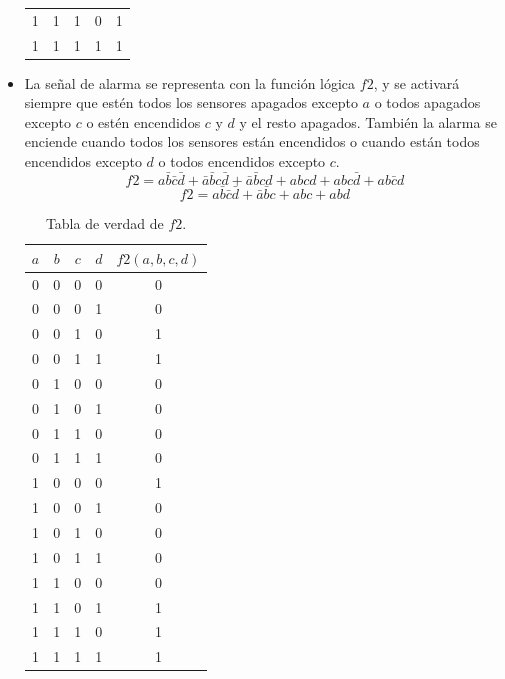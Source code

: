 \begin{itemize}
\begin{table}[H]
\begin{tabular}{ccccc}
        1 & 1 & 1 & 0 & 1 \\
        1 & 1 & 1 & 1 & 1 \\
        \bottomrule
    \end{tabular}
    \end{table}
    \item La señal de  alarma se representa con la función lógica $f2$, y se activará siempre que estén todos los sensores apagados excepto $a$ o todos apagados excepto $c$ o estén encendidos $c$ y $d$ y el resto apagados. 
    También la alarma se enciende cuando todos los sensores están encendidos o cuando están todos encendidos excepto $d$ o todos encendidos excepto $c$.
    \begin{equation*}
        f2 = a\bar{b}\bar{c}\bar{d} + \bar{a}\bar{b}c\bar{d} + \bar{a}\bar{b}cd + abcd + abc\bar{d} + ab\bar{c}d
    \end{equation*}
    \begin{equation*}
        f2 = a\bar{b}\bar{c}\bar{d} + \bar{a}\bar{b}c + abc + abd
    \end{equation*}
    \begin{table}[H]
    \centering
    \caption{Tabla de verdad de $f2$.}
    \label{tab:tv_f2}
    \begin{tabular}{ccccc}
        \toprule
        $a$ & $b$ & $c$ & $d$ & $f2(a,b,c,d)$ \\
        \midrule
        0 & 0 & 0 & 0 & 0 \\
        0 & 0 & 0 & 1 & 0 \\
        0 & 0 & 1 & 0 & 1 \\
        0 & 0 & 1 & 1 & 1 \\
        0 & 1 & 0 & 0 & 0 \\
        0 & 1 & 0 & 1 & 0 \\
        0 & 1 & 1 & 0 & 0 \\
        0 & 1 & 1 & 1 & 0 \\
        1 & 0 & 0 & 0 & 1 \\
        1 & 0 & 0 & 1 & 0 \\
        1 & 0 & 1 & 0 & 0 \\
        1 & 0 & 1 & 1 & 0 \\
        1 & 1 & 0 & 0 & 0 \\
        1 & 1 & 0 & 1 & 1 \\
        1 & 1 & 1 & 0 & 1 \\
        1 & 1 & 1 & 1 & 1 \\
        \bottomrule
    \end{tabular}

\end{table}
\end{itemize}
